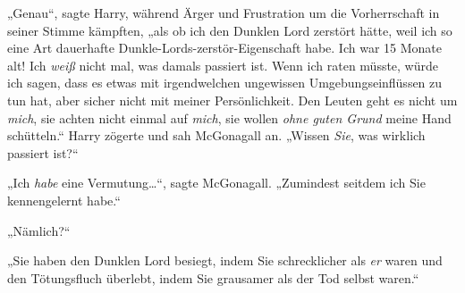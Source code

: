„Genau“, sagte Harry, während Ärger und Frustration um die Vorherrschaft in seiner Stimme kämpften, „als ob ich den Dunklen Lord zerstört hätte, weil ich so eine Art dauerhafte Dunkle-Lords-zerstör-Eigenschaft habe. Ich war 15 Monate alt! Ich \emph{weiß} nicht mal, was damals passiert ist. Wenn ich raten müsste, würde ich sagen, dass es etwas mit irgendwelchen ungewissen Umgebungseinflüssen zu tun hat, aber sicher nicht mit meiner Persönlichkeit. Den Leuten geht es nicht um \emph{mich}, sie achten nicht einmal auf \emph{mich}, sie wollen \emph{ohne guten Grund} meine Hand schütteln.“ Harry zögerte und sah McGonagall an. „Wissen \emph{Sie}, was wirklich passiert ist?“

„Ich \emph{habe} eine Vermutung…“, sagte McGonagall. „Zumindest seitdem ich Sie kennengelernt habe.“

„Nämlich?“

„Sie haben den Dunklen Lord besiegt, indem Sie schrecklicher als \emph{er} waren und den Tötungsfluch überlebt, indem Sie grausamer als der Tod selbst waren.“

